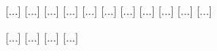\documentclass[12pt, a4paper]{article}
\begin{document}
\begin{center}
{                                                                                                                                                                                                    [...]
                                                                                                                                                                                                    [...]
                                                                                                                                                                                                    [...]
                                                                                                                                                                                                    [...]
                                                                                                                                                                                                    [...]
                                                                                                                                                                                                    [...]
                                                                                                                                                                                                    [...]
                                                                                                                                                                                                    [...]
                                                                                                                                                                                                    [...]
                                                                                                                                                                                                    [...]
                                                                                                                                                                                                    [...]

                                                                                                                                                                                                    [...]
                                                                                                                                                                                                    [...]
                                                                                                                                                                                                    [...]
                                                                                                                                                                                                    [...]

}
\end{center}
\end{document}
